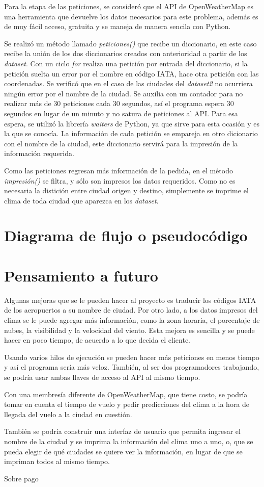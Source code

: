 \documentclass[]{article}
\begin{document}
Para la etapa de las peticiones, se consideró que el API de OpenWeatherMap 
es una herramienta que devuelve los datos necesarios para este problema, 
además es de muy fácil acceso, gratuita y se maneja de manera sencila con 
Python.

Se realizó un método llamado \emph{peticiones()} que recibe un diccionario, 
en este caso recibe la unión de los dos diccionarios creados con anterioridad 
a partir de los \emph{dataset}. Con un ciclo \emph{for} realiza una petición 
por entrada del diccionario, si la petición suelta un error por el nombre en 
código IATA, hace otra petición con las coordenadas. Se verificó que en el 
caso de las ciudades del  \emph{dataset2} no ocurriera ningún error por el 
nombre de la ciudad. Se auxilia con un contador para no realizar más de 30 
peticiones cada 30 segundos, así el programa espera 30 segundos en lugar 
de un minuto y no satura de peticiones al API. Para esa espera, se utilizó la 
librería \emph{waiters} de Python, ya que sirve para esta ocasión y es la que 
se conocía. La información de cada petición se empareja en otro dicionario 
con el nombre de la ciudad, este diccionario servirá para la impresión de la 
información requerida.

Como las peticiones regresan más información de la pedida, en el método
\emph{impresión()} se filtra, y sólo son impresos los datos requeridos. Como 
no es necesaria la distición entre ciudad origen y destino, simplemente se 
imprime el clima de toda ciudad que aparezca en los \emph{dataset}.

\section{Diagrama de flujo o pseudocódigo}


\section{Pensamiento a futuro}

Algunas mejoras que se le pueden hacer al proyecto es traducir los códigos 
IATA de los aeropuertos a su nombre de ciudad. Por otro lado, a los datos 
impresos del clima se le puede agregar más información, como la zona 
horaria, el porcentaje de nubes, la visibilidad y la velocidad del viento. Esta 
mejora es sencilla y se puede hacer en poco tiempo, de acuerdo a lo que 
decida el cliente.

Usando varios hilos de ejecución se pueden hacer más peticiones en menos 
tiempo y así el programa sería más veloz. También, al ser dos 
programadores trabajando, se podría usar ambas llaves de acceso al API al 
mismo tiempo.

Con una membresía diferente de OpenWeatherMap, que tiene costo, se 
podría tomar en cuenta el tiempo de vuelo y pedir predicciones del clima a la 
hora de llegada del vuelo a la ciudad en cuestión.

También se podría construir una interfaz de usuario que permita ingresar 
el nombre de la ciudad y se imprima la información del clima uno a uno, o, 
que se pueda elegir de qué ciudades se quiere ver la información, en lugar de 
que se impriman todos al mismo tiempo.

Sobre pago
\end{document}
